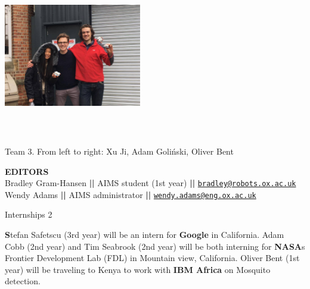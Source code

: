 \documentclass[10pt,final]{papertex}
\begin{document}
\begin{frontpage}
\begin{multicols}{2}
{	\noindent \includegraphics[width=6cm,height=6cm,keepaspectratio]{img/winning}
    \caption{\\\small{Team 3. From left to right: Xu Ji, Adam Goli\'nski, Oliver Bent}} 
	}
\end{multicols}
\begin{mdframed}[leftmargin=7pt,rightmargin=7pt]
	\textbf{EDITORS}\\
	Bradley Gram-Hansen \textbf{||} AIMS student (1st year) \textbf{||} \href{mailto:bradley@robots.ox.ac.uk}{\texttt{bradley@robots.ox.ac.uk}}\\
	Wendy Adams \hspace{1cm}       \textbf{||} AIMS administrator \hspace{0.5cm} \textbf{||} \href{mailto:wendy.adams@eng.ox.ac.uk}{\texttt{wendy.adams@eng.ox.ac.uk}}\\
	
\end{mdframed}


%
%
%
%



\end{frontpage}

\newsection{}

\begin{news}{1}
	{Internships}
	{}
	{}
	{2}


\textbf{S}tefan Safetscu (3rd year) will be an intern for \textbf{Google} in California. Adam Cobb (2nd year) and Tim Seabrook (2nd year) will be both interning for \textbf{NASA}s Frontier Development Lab (FDL) in Mountain view, California. 
Oliver Bent (1st year) will be traveling to Kenya to work with \textbf{IBM Africa} on Mosquito detection. 
\end{news}
\end{document}
